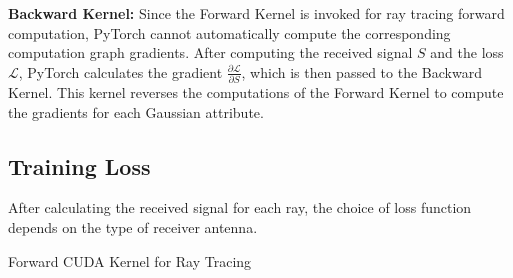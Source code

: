 \textbf{Backward Kernel:}
Since the Forward Kernel is invoked for ray tracing forward computation, PyTorch cannot automatically compute the corresponding computation graph gradients.
After computing the received signal \(S\) and the loss \(\mathcal{L}\), PyTorch calculates the gradient \(\frac{\partial \mathcal{L}}{\partial S}\), which is then passed to the Backward Kernel.  
This kernel reverses the computations of the Forward Kernel to compute the gradients for each Gaussian attribute.




\subsection{Training Loss}\label{sec_training_loss}
After calculating the received signal for each ray, the choice of loss function depends on the type of receiver antenna.


\begin{algorithm}[!tp]
\caption{Forward CUDA Kernel for Ray Tracing}
\label{alg_cuda}

\end{algorithm}


